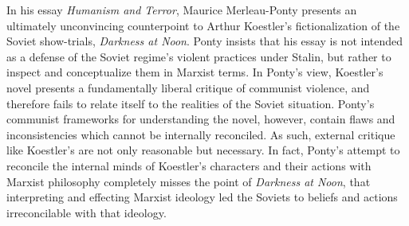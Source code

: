 \newcommand{\huter}{\textit{Humanism and Terror}}
\newcommand{\dark}{\textit{Darkness at Noon}}

In his essay \huter{}, Maurice Merleau-Ponty presents an ultimately unconvincing
counterpoint to Arthur Koestler's fictionalization of the Soviet show-trials,
\dark{}. Ponty insists that his essay is not intended as a defense of the Soviet regime's
violent practices under Stalin, but rather to inspect and conceptualize them in Marxist
terms. In Ponty's view, Koestler's novel presents a fundamentally liberal critique of
communist violence, and therefore fails to relate itself to the realities of the Soviet
situation. Ponty's communist frameworks for understanding the novel, however, contain
flaws and inconsistencies which cannot be internally reconciled. As such, external
critique like Koestler's are not only reasonable but necessary. In fact, Ponty's attempt
to reconcile the internal minds of Koestler's characters and their actions with Marxist
philosophy completely misses the point of \dark{}, that interpreting and effecting Marxist
ideology led the Soviets to beliefs and actions irreconcilable with that ideology.


